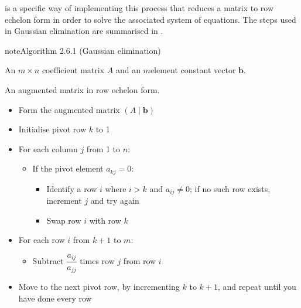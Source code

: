 \documentclass[letterpaper,10pt,english]{jupyterBook}
\begin{document}
\sphinxAtStartPar
{} is a specific way of implementing this process that reduces a matrix to row echelon form in order to solve the associated system of equations. The steps used in Gaussian elimination are summarised in {\hyperref[\detokenize{_pages/2.3_Gaussian_elimination:ge-algorithm}]{}}.

\ignorespaces \label{_pages/2.3_Gaussian_elimination:ge-algorithm}
\begin{sphinxadmonition}{note}{Algorithm 2.6.1 (Gaussian elimination)}



\sphinxAtStartPar
{} An \(m \times n\) coefficient matrix \(A\) and an \(m\)\sphinxhyphen{}element constant vector \(\mathbf{b}\).

\sphinxAtStartPar
{} An augmented matrix in row echelon form.
\begin{itemize}
\item {} 
\sphinxAtStartPar
Form the augmented matrix \(( A \mid \mathbf{b} )\)

\item {} 
\sphinxAtStartPar
Initialise pivot row \(k\) to 1

\item {} 
\sphinxAtStartPar
For each column \(j\) from 1 to \(n\):
\begin{itemize}
\item {} 
\sphinxAtStartPar
If the pivot element \(a_{kj} = 0\):
\begin{itemize}
\item {} 
\sphinxAtStartPar
Identify a row \(i\) where \(i > k\) and \(a_{ij} \neq 0\); if no such row exists, increment \(j\) and try again

\item {} 
\sphinxAtStartPar
Swap row \(i\) with row \(k\)

\end{itemize}

\end{itemize}

\item {} 
\sphinxAtStartPar
For each row \(i\) from \(k+1\) to \(m\):
\begin{itemize}
\item {} 
\sphinxAtStartPar
Subtract \(\dfrac{a_{ij}}{a_{jj}}\) times row \(j\) from row \(i\)

\end{itemize}

\item {} 
\sphinxAtStartPar
Move to the next pivot row, by incrementing \(k\) to \(k+1\), and repeat until you have done every row

\end{itemize}
\end{sphinxadmonition}
\end{document}
